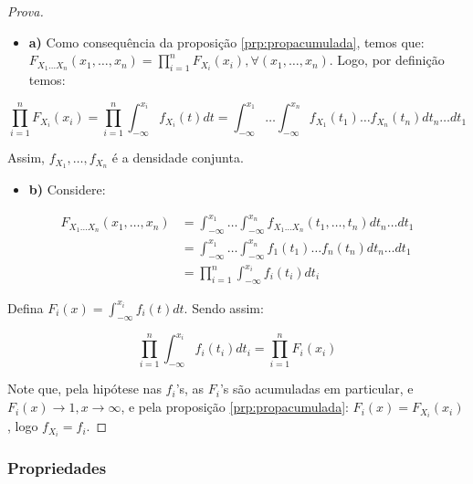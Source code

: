 \documentclass[
]{article}
\providecommand{\tightlist}{%
  \setlength{\itemsep}{0pt}\setlength{\parskip}{0pt}}
\theoremstyle{definition}
\theoremstyle{definition}
\theoremstyle{definition}
\theoremstyle{definition}
\theoremstyle{remark}
\begin{document}
\begin{proof}[Prova]
\leavevmode

\begin{itemize}
\tightlist
\item
  \textbf{a)} Como consequência da proposição \ref{prp:propacumulada}, temos que: \(F_{X_{1}\ldots X_{n}}(x_{1},\ldots,x_{n}) = \prod_{i=1}^{n}F_{X_{i}}(x_{i}), \forall (x_{1},\ldots,x_{n})\). Logo, por definição temos:
\end{itemize}

\begin{equation*}
\prod_{i=1}^{n}F_{X_{i}}(x_{i}) = \prod_{i=1}^{n}\int_{-\infty}^{x_{i}}f_{X_{i}}(t)dt = \int_{-\infty}^{x_{1}}\dots\int_{-\infty}^{x_{n}}f_{X_{1}}(t_{1})\ldots f_{X_{n}}(t_{n}) dt_{n} \ldots dt_{1}
\end{equation*}

Assim, \(f_{X_{1}},\ldots,f_{X_{n}}\) é a densidade conjunta.

\begin{itemize}
\tightlist
\item
  \textbf{b)} Considere:
\end{itemize}

\begin{align*}
F_{X_{1}\ldots X_{n}}(x_{1},\ldots,x_{n}) &= \int_{-\infty}^{x_{1}} \dots \int_{-\infty}^{x_{n}}f_{X_{1}\ldots X_{n}}(t_{1},\ldots,t_{n})dt_{n}\ldots dt_{1} \\
&= \int_{-\infty}^{x_{1}} \dots \int_{-\infty}^{x_{n}}f_{1}(t_{1}) \ldots f_{n}(t_{n}) dt_{n} \ldots dt_{1} \\
&= \prod_{i=1}^{n}\int_{-\infty}^{x_{i}}f_{i}(t_{i})dt_{i}
\end{align*}

Defina \(F_{i}(x) = \int_{-\infty}^{x_{i}}f_{i}(t)dt\). Sendo assim:

\begin{equation*}
\prod_{i=1}^{n} \int_{-\infty}^{x_{i}}f_{i}(t_{i})dt_{i} = \prod_{i=1}^{n}F_{i}(x_{i})
\end{equation*}

Note que, pela hipótese nas \(f_{i}\)'s, as \(F_{i}\)'s são acumuladas em particular, e \(F_{i}(x) \to 1, x \to \infty\), e pela proposição \ref{prp:propacumulada}: \(F_{i}(x) = F_{X_{i}}(x_{i})\), logo \(f_{X_{i}} = f_{i}\).

\end{proof}

\hypertarget{propriedades}{%
\subsubsection{Propriedades}\label{propriedades}}
\end{document}
